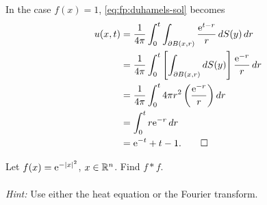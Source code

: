 \begin{solution*}
  In the case \(f(x)=1\), \eqref{eq:fp:duhamels-sol} becomes
  \begin{align*}
    u(x,t)
    &=\frac{1}{4\pi}
      \int_0^t\int_{\partial B(x,r)}\frac{\mathrm{e}^{t-r}}{r}\mathop{}\!d S(y)\mathop{}\!d
      r\\
    &=\frac{1}{4\pi}\int_0^t
      \left[\int_{\partial B(x,r)}\mathop{}\!d S(y)\right]\frac{\mathrm{e}^{-r}}{r}\mathop{}\!d r\\
    &=\frac{1}{4\pi}\int_0^t 4\pi r^2\left(\frac{\mathrm{e}^{-r}}{r}\right)\mathop{}\!d
      r\\
    &=\int_0^tr\mathrm{e}^{-r}\mathop{}\!d r\\
    &=\mathrm{e}^{-t}+t-1.\qedhere
  \end{align*}
\end{solution*}

\begin{problem}
  Let \(f(x)=\mathrm{e}^{-|x|^2}\), \(x\in\mathbb{R}^n\). Find \(f*f\).
  \\\\
  \emph{Hint:} Use either the heat equation or the Fourier transform.
\end{problem}
